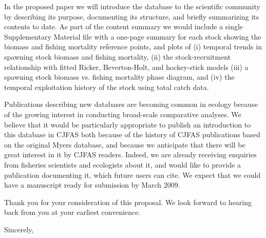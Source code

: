 \documentclass[12pt]{refletter}
\begin{document}
\begin{letter}
In the proposed paper we will introduce the database to the scientific community by describing its purpose, documenting its structure, and briefly summarizing its contents to date. As part of the content summary we would include a single Supplementary Material file with a one-page summary for each stock showing the biomass and fishing mortality reference points, and plots of (i) temporal trends in spawning stock biomass and fishing mortality, (ii) the stock-recruitment relationship with fitted Ricker, Beverton-Holt, and hockey-stick models (iii) a spawning stock biomass vs. fishing mortality phase diagram, and (iv) the temporal exploitation history of the stock using total catch data. 

Publications describing new databases are becoming common in ecology because of the growing interest in conducting broad-scale comparative analyses. We believe that it would be particularly appropriate to publish an introduction to this database in CJFAS both because of the history of CJFAS publications based on the original Myers database, and because we anticipate that there will be great interest in it by CJFAS readers. Indeed, we are already receiving enquiries from fisheries scientists and ecologists about it, and would like to provide a publication documenting it, which future users can cite. We expect that we could have a manuscript ready for submission by March 2009. 

Thank you for your consideration of this proposal. We look forward to hearing back from you at your earliest convenience. 

\closing{Sincerely,}




\end{letter}
\end{document}
